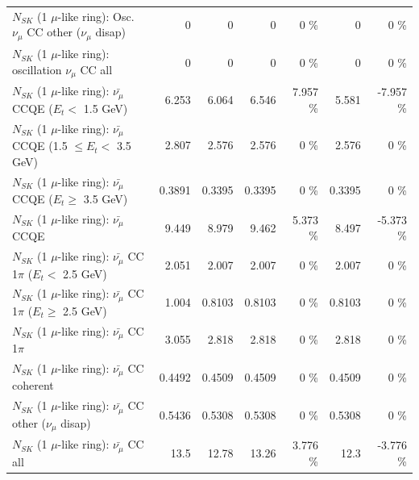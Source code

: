 \begin{table}
\begin{tabular}{| l | r | r | r  r | r  r |}
         $N_{SK}$ (1 $\mu$-like ring): Osc. $\nu_\mu$ CC other ($\nu_\mu$ disap) &               0 &               0 &               0 &        0 \%  &               0 &        0 \%  \\ 
                      $N_{SK}$ (1 $\mu$-like ring): oscillation $\nu_\mu$ CC all &               0 &               0 &               0 &        0 \%  &               0 &        0 \%  \\ 
\hline
\hline
          $N_{SK}$ (1 $\mu$-like ring): $\bar{\nu_\mu}$ CCQE ($E_{t} <$ 1.5 GeV) &           6.253 &           6.064 &           6.546 &    7.957 \%  &           5.581 &   -7.957 \%  \\ 
 $N_{SK}$ (1 $\mu$-like ring): $\bar{\nu_\mu}$ CCQE (1.5 $\leq E_{t} <$ 3.5 GeV) &           2.807 &           2.576 &           2.576 &        0 \%  &           2.576 &        0 \%  \\ 
       $N_{SK}$ (1 $\mu$-like ring): $\bar{\nu_\mu}$ CCQE ($E_{t} \geq$ 3.5 GeV) &          0.3891 &          0.3395 &          0.3395 &        0 \%  &          0.3395 &        0 \%  \\ 
\hline
                              $N_{SK}$ (1 $\mu$-like ring): $\bar{\nu_\mu}$ CCQE &           9.449 &           8.979 &           9.462 &    5.373 \%  &           8.497 &   -5.373 \%  \\ 
\hline
     $N_{SK}$ (1 $\mu$-like ring): $\bar{\nu_\mu}$ CC 1$\pi$ ($E_{t} <$ 2.5 GeV) &           2.051 &           2.007 &           2.007 &        0 \%  &           2.007 &        0 \%  \\ 
  $N_{SK}$ (1 $\mu$-like ring): $\bar{\nu_\mu}$ CC 1$\pi$ ($E_{t} \geq$ 2.5 GeV) &           1.004 &          0.8103 &          0.8103 &        0 \%  &          0.8103 &        0 \%  \\ 
\hline
                         $N_{SK}$ (1 $\mu$-like ring): $\bar{\nu_\mu}$ CC 1$\pi$ &           3.055 &           2.818 &           2.818 &        0 \%  &           2.818 &        0 \%  \\ 
                       $N_{SK}$ (1 $\mu$-like ring): $\bar{\nu_\mu}$ CC coherent &          0.4492 &          0.4509 &          0.4509 &        0 \%  &          0.4509 &        0 \%  \\ 
        $N_{SK}$ (1 $\mu$-like ring): $\bar{\nu_\mu}$ CC other ($\nu_\mu$ disap) &          0.5436 &          0.5308 &          0.5308 &        0 \%  &          0.5308 &        0 \%  \\ 
                          $N_{SK}$ (1 $\mu$-like ring): $\bar{\nu_{\mu}}$ CC all &            13.5 &           12.78 &           13.26 &    3.776 \%  &            12.3 &   -3.776 \%  \\ 

\end{tabular}
\end{table}
